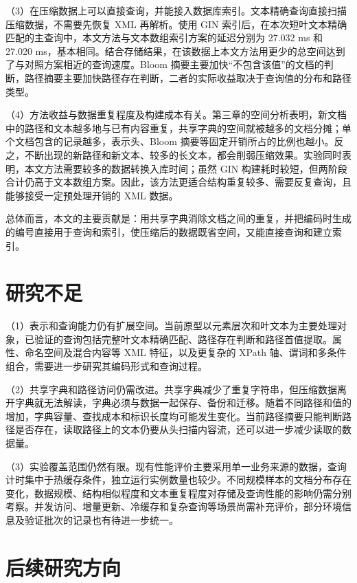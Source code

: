（3）在压缩数据上可以直接查询，并能接入数据库索引。文本精确查询直接扫描压缩数据，不需要先恢复 XML 再解析。使用 GIN 索引后，在本次短叶文本精确匹配的主查询中，本文方法与文本数组索引方案的延迟分别为 27.032 ms 和 27.020 ms，基本相同。结合存储结果，在该数据上本文方法用更少的总空间达到了与对照方案相近的查询速度。Bloom 摘要主要加快“不包含该值”的文档的判断，路径摘要主要加快路径存在判断，二者的实际收益取决于查询值的分布和路径类型。

（4）方法收益与数据重复程度及构建成本有关。第三章的空间分析表明，新文档中的路径和文本越多地与已有内容重复，共享字典的空间就被越多的文档分摊；单个文档包含的记录越多，表示头、Bloom 摘要等固定开销所占的比例也越小。反之，不断出现的新路径和新文本、较多的长文本，都会削弱压缩效果。实验同时表明，本文方法需要较多的数据转换入库时间；虽然 GIN 构建耗时较短，但两阶段合计仍高于文本数组方案。因此，该方法更适合结构重复较多、需要反复查询，且能够接受一定预处理开销的 XML 数据。

总体而言，本文的主要贡献是：用共享字典消除文档之间的重复，并把编码时生成的编号直接用于查询和索引，使压缩后的数据既省空间，又能直接查询和建立索引。

\section*{研究不足}

（1）表示和查询能力仍有扩展空间。当前原型以元素层次和叶文本为主要处理对象，已验证的查询包括完整叶文本精确匹配、路径存在判断和路径首值提取。属性、命名空间及混合内容等 XML 特征，以及更复杂的 XPath 轴、谓词和多条件组合，需要进一步研究其编码形式和查询过程。

（2）共享字典和路径访问仍需改进。共享字典减少了重复字符串，但压缩数据离开字典就无法解读，字典必须与数据一起保存、备份和迁移。随着不同路径和值的增加，字典容量、查找成本和标识长度均可能发生变化。当前路径摘要只能判断路径是否存在，读取路径上的文本仍要从头扫描内容流，还可以进一步减少读取的数据量。

（3）实验覆盖范围仍然有限。现有性能评价主要采用单一业务来源的数据，查询计时集中于热缓存条件，独立运行实例数量也较少。不同规模样本的文档分布存在变化，数据规模、结构相似程度和文本重复程度对存储及查询性能的影响仍需分别考察。并发访问、增量更新、冷缓存和复杂查询等场景尚需补充评价，部分环境信息及验证批次的记录也有待进一步统一。

\section*{后续研究方向}

